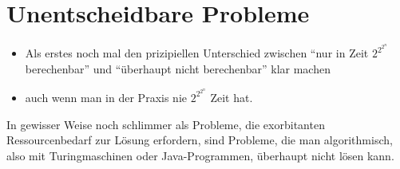 




\Tut\section{Unentscheidbare Probleme}
\label{sec:unentscheidbare-probleme}

\begin{tutorium}
  \begin{itemize}
  \item Als erstes noch mal den prizipiellen Unterschied zwischen
    "`nur in Zeit $2^{2^{2^n}}$ berechenbar"' und "`überhaupt nicht
    berechenbar"' klar machen
  \item auch wenn man in der Praxis nie $2^{2^{2^n}}$ Zeit hat.
  \end{itemize}
\end{tutorium}
In gewisser Weise noch schlimmer als Probleme, die exorbitanten
Ressourcenbedarf zur Lösung erfordern, sind Probleme, die man
algorithmisch, also \zB mit Turingmaschinen oder Java-Programmen,
überhaupt nicht lösen kann.

